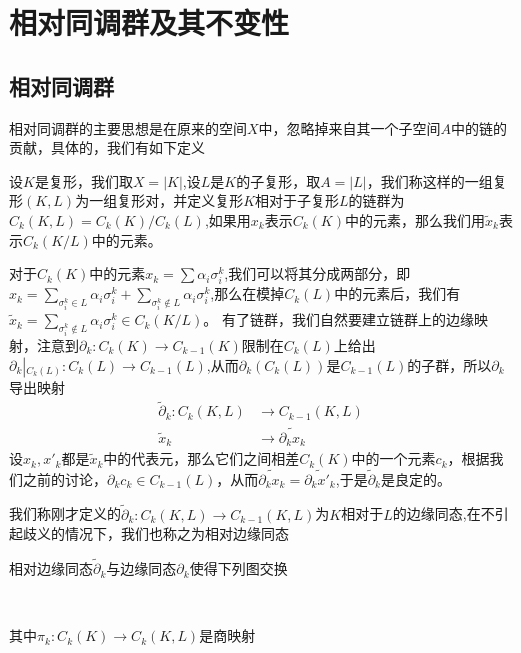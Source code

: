 \chapter{相对同调群及其不变性}
\section{相对同调群}
相对同调群的主要思想是在原来的空间$X$中，忽略掉来自其一个子空间$A$中的链的贡献，具体的，我们有如下定义
\begin{definition}
设$K$是复形，我们取$X=|K|$,设$L$是$K$的子复形，取$A=|L|$，我们称这样的一组复形$(K,L)$为一组复形对，并定义复形$K$相对于子复形$L$的链群为$C_{k}(K,L)=C_{k}(K)/C_{k}(L)$,如果用$x_{k}$表示$C_{k}(K)$中的元素，那么我们用$\tilde{x}_{k}$表示$C_{k}(K/L)$中的元素。
\end{definition}
对于$C_{k}(K)$中的元素$x_{k}=\sum\alpha_{i}\sigma_{i}^{k}$,我们可以将其分成两部分，即$x_{k}=\sum\limits_{\sigma^{k}_{i}\in L}\alpha_{i}\sigma_{i}^{k}+\sum\limits_{\sigma^{k}_{i}\notin L}\alpha_{i}\sigma_{i}^{k}$,那么在模掉$C_{k}(L)$中的元素后，我们有$\tilde{x}_{k}=\sum\limits_{\sigma^{k}_{i}\notin L}\alpha_{i}\sigma_{i}^{k}\in C_{k}(K/L)$。
有了链群，我们自然要建立链群上的边缘映射，注意到$\partial_{k}:C_{k}(K)\rightarrow C_{k-1}(K)$限制在$C_{k}(L)$上给出$\partial_{k}\left|_{C_{k}(L)}\right.:C_{k}(L)\rightarrow C_{k-1}(L)$,从而$\partial_{k}(C_{k}(L))$是$C_{k-1}(L)$的子群，所以$\partial_{k}$导出映射
\begin{equation}
    \begin{aligned}
    \tilde{\partial}_{k}:C_{k}(K,L)&\rightarrow C_{k-1}(K,L)\\
    \tilde{x}_{k}&\rightarrow \widetilde{\partial_{k}x_{k}}
    \end{aligned}
\end{equation}
设$x_{k},x'_{k}$都是$\tilde{x}_{k}$中的代表元，那么它们之间相差$C_{k}(K)$中的一个元素$c_{k}$，根据我们之前的讨论，$\partial_{k}c_{k}\in C_{k-1}(L)$，从而$\widetilde{\partial_{k}x_{k}}=\widetilde{\partial_{k}x'_{k}}$,于是$\tilde{\partial}_{k}$是良定的。
\begin{definition}
我们称刚才定义的$\tilde{\partial}_{k}:C_{k}(K,L)\rightarrow C_{k-1}(K,L)$为$K$相对于$L$的边缘同态,在不引起歧义的情况下，我们也称之为相对边缘同态
\end{definition}
\begin{proposition}\label{chap3_peo_19}
相对边缘同态$\tilde{\partial}_{k}$与边缘同态$\partial_{k}$使得下列图交换
{\center
{}\\}
其中$\pi_{k}:C_{k}(K)\rightarrow C_{k}(K,L)$是商映射
\end{proposition}
